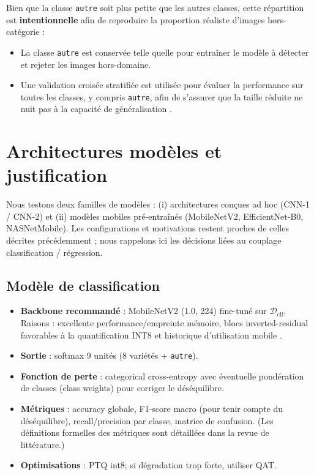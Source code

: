 Bien que la classe \texttt{autre} soit plus petite que les autres classes, cette répartition est \textbf{intentionnelle} afin de reproduire la proportion réaliste d’images hors-catégorie :

\begin{itemize}
	\item La classe \texttt{autre} est conservée telle quelle pour entraîner le modèle à détecter et rejeter les images hors-domaine.
	\item Une validation croisée stratifiée est utilisée pour évaluer la performance sur toutes les classes, y compris \texttt{autre}, afin de s’assurer que la taille réduite ne nuit pas à la capacité de généralisation \cite{buda2018systematic}.
\end{itemize}


\section{Architectures modèles et justification}

Nous testons deux familles de modèles : (i) architectures conçues ad hoc (CNN-1 / CNN-2) et (ii) modèles mobiles pré-entraînés (MobileNetV2, EfficientNet-B0, NASNetMobile). Les configurations et motivations restent proches de celles décrites précédemment ; nous rappelons ici les décisions liées au couplage classification / régression.

\subsection{Modèle de classification}

\begin{itemize}
	\item \textbf{Backbone recommandé} : MobileNetV2 (1.0, 224) fine-tuné sur \(\mathcal{D}_{\text{clf}}\). Raisons : excellente performance/empreinte mémoire, blocs inverted-residual favorables à la quantification INT8 et historique d'utilisation mobile \cite{sandler2018mobilenetv2}.
	\item \textbf{Sortie} : softmax 9 unités (8 variétés + \texttt{autre}).
	\item \textbf{Fonction de perte} : categorical cross-entropy avec éventuelle pondération de classes (class weights) pour corriger le déséquilibre.
	\item \textbf{Métriques} : accuracy globale, F1-score macro (pour tenir compte du déséquilibre), recall/precision par classe, matrice de confusion. (Les définitions formelles des métriques sont détaillées dans la revue de littérature.)
	\item \textbf{Optimisations} : PTQ int8; si dégradation trop forte, utiliser QAT.
\end{itemize}

